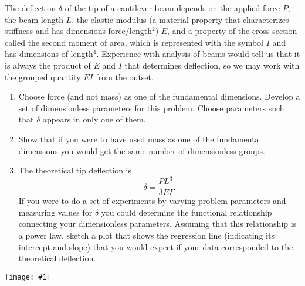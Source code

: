 \documentclass[12pt,letterpaper]{hmcpset}
\newcommand{\diagram}[2]{\begin{center}\texttt{[image: \#1]}\end{center}}
\begin{document}
	

\begin{problem}[1]
	 The deflection $\delta$ of the tip of a cantilever beam depends on the applied force $P$, the beam
	 length $L$, the elastic modulus (a material property that characterizes stiffness and has
	 dimensions force/length$^2$) $E$, and a property of the cross section called the second moment of
	 area, which is represented with the symbol $I$ and has dimensions of length$^4$. Experience with
	 analysis of beams would tell us that it is always the product of $E$ and $I$ that determines
	 deflection, so we may work with the grouped quantity $EI$ from the outset.
	 \begin{enumerate}
	 	\item Choose force (and not mass) as one of the fundamental dimensions. Develop a set of	 dimensionless parameters for this problem. Choose parameters such that $\delta$ appears in only one of them.
	 	
	 	\item Show that if you were to have used mass as one of the fundamental dimensions you
	 	would get the same number of dimensionless groups.
	 	
	 	\item The theoretical tip deflection is
	 	$$ \delta = \frac{PL^3}{3EI}. $$
	 	If you were to do a set of experiments by varying problem parameters and measuring
	 	values for $\delta$ you could determine the functional relationship connecting your dimensionless parameters. Assuming that this relationship is a power law, sketch a plot that shows the regression line (indicating its intercept and slope) that you would expect if your data corresponded to the theoretical deflection.
	 \end{enumerate} 
	 \diagram{Beam}{2}
\end{problem}

\begin{solution}
\vfill
\end{solution}

\newpage
\end{document}
